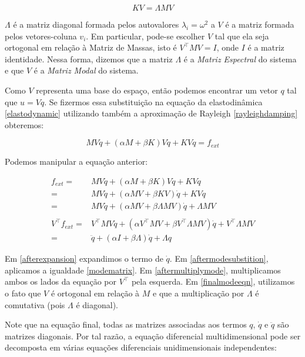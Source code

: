 \begin{equation}
	KV = \Lambda M V
	\label{modematrix}
\end{equation}

$\Lambda$ é a matriz diagonal formada pelos autovalores $\lambda_i = \omega^2$ a $V$ é a matriz formada pelos vetores-coluna $v_i$. Em particular, pode-se escolher $V$ tal que ela seja ortogonal em relação à Matriz de Massas, isto é $V^\intercal M V = I$, onde $I$ é a matriz identidade. Nessa forma, dizemos que a matriz $\Lambda$ é a \emph{Matriz Espectral} do sistema e que $V$ é a \emph{Matriz Modal} do sistema.

Como $V$ representa uma base do espaço, então podemos encontrar um vetor $q$ tal que $u = Vq$. Se fizermos essa substituição na equação da elastodinâmica \eqref{elastodynamic} utilizando também a aproximação de Rayleigh \eqref{rayleighdamping} obteremos:

\begin{equation}
	MV\ddot{q} + (\alpha M + \beta{K})V\dot{q} + KVq = f_{ext}
\end{equation}

Podemos manipular a equação anterior:

\begin{eqnarray}
	f_{ext} =& MV\ddot{q} + (\alpha M + \beta{K})V\dot{q} + KVq \label{preexpansion}\\
	=& MV\ddot{q} + (\alpha MV + \beta KV)\dot{q} + KVq \label{afterexpansion}\\
	=& MV\ddot{q} + (\alpha MV + \beta \Lambda M V)\dot{q} + \Lambda M V \label{aftermodesubstition}\\
	\nonumber\\
	V^\intercal f_{ext} =& V^\intercal MV\ddot{q} + (\alpha V^\intercal MV + \beta V^\intercal \Lambda M V)\dot{q} + V^\intercal \Lambda M V\label{aftermultiplymode}\\
	=& \ddot{q} + (\alpha I + \beta\Lambda)\dot{q} + \Lambda q\label{finalmodeeqn}
\end{eqnarray}

Em \eqref{afterexpansion} expandimos o termo de $\dot{q}$. Em \eqref{aftermodesubstition}, aplicamos a igualdade \eqref{modematrix}. Em \eqref{aftermultiplymode}, multiplicamos ambos os lados da equação por $V^\intercal$ pela esquerda. Em \eqref{finalmodeeqn}, utilizamos o fato que $V$ é ortogonal em relação à $M$ e que a multiplicação por $\Lambda$ é comutativa (pois $\Lambda$ é diagonal).

Note que na equação final, todas as matrizes associadas aos termos $q$, $\dot{q}$ e $\ddot{q}$ são matrizes diagonais. Por tal razão, a equação diferencial multidimensional pode ser decomposta em várias equações diferenciais unidimensionais independentes:

